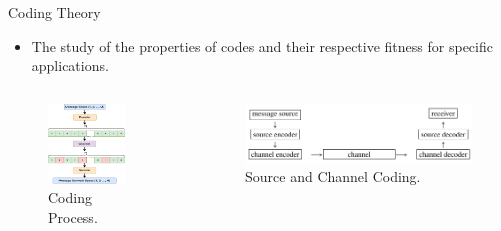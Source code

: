 \begin{frame}{Coding Theory}
    \begin{itemize}
        \item The study of the properties of codes and their respective fitness for specific applications.
    \end{itemize}
    \begin{columns}
        \begin{column}{0.5\textwidth}
            \begin{figure}
            \centering
                \includegraphics[width=0.8\textwidth]{Images/Introduction/CodingTheory.png}
                \caption{Coding Process.}
                \label{fig:coding_process}
            \end{figure}
        \end{column}
        
        \begin{column}{0.5\textwidth}
            \begin{figure}
                \centering
                \includegraphics[width=\textwidth]{Images/Introduction/sourceandchannelcoding.png}
                \caption{Source and Channel Coding.}
                \label{fig:sourcechannelcoding}
            \end{figure}    
        \end{column}    
    \end{columns}
\end{frame}

